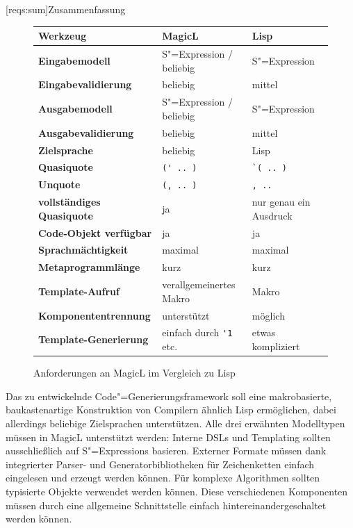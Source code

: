 \documentclass[12pt, a4paper, bibgerm]{scrbook}
\newcommand\icode[1]{\lstinline?#1?}
\newcommand\lsection{}
\newcommand{\sexp}{S"=Expression}
\newcommand{\sexps}{S"=Expressions}
\newcommand{\cgen}{Code"=Generierung}
\begin{document}
\lsection[reqs:sum]{Zusammenfassung}

\begin{figure}[h]
\begin{tabular}{|l|l|l|} \hline
\bf Werkzeug                 & \bf MagicL                    & \bf Lisp               \\\hline\hline    
\bf Eingabemodell            & \sexp{} / beliebig            & \sexp{}                \\\hline           
\bf Eingabevalidierung       & beliebig                      & mittel                 \\\hline      
\bf Ausgabemodell            & \sexp{} / beliebig            & \sexp{}                \\\hline      
\bf Ausgabevalidierung       & beliebig                      & mittel                 \\\hline      
\bf Zielsprache              & beliebig                      & Lisp                   \\\hline      
\bf Quasiquote               & \icode{(' .. )}               & \icode{`( .. )}        \\\hline   
\bf Unquote                  & \icode{(, .. )}               & \icode{, .. }          \\\hline
\bf vollständiges Quasiquote & ja                            & nur genau ein Ausdruck \\\hline      
\bf Code-Objekt verfügbar    & ja                            & ja                     \\\hline      
\bf Sprachmächtigkeit        & maximal                       & maximal                \\\hline      
\bf Metaprogrammlänge        & kurz                          & kurz                   \\\hline
\bf Template-Aufruf          & verallgemeinertes Makro       & Makro                  \\\hline      
\bf Komponententrennung      & unterstützt                   & möglich                \\\hline      
\bf Template-Generierung     & einfach durch \icode{'1} etc. & etwas kompliziert      \\\hline      
\end{tabular}
\caption{Anforderungen an MagicL im Vergleich zu Lisp}
\label{magicl:fig:reqs_sum}
\end{figure}

Das zu entwickelnde \cgen{}sframework soll eine makrobasierte,
baukastenartige Konstruktion von Compilern ähnlich Lisp ermöglichen,
dabei allerdings beliebige Zielsprachen unterstützen. Alle drei
erwähnten Modelltypen müssen in MagicL unterstützt werden: Interne DSLs
und Templating sollten ausschließlich auf \sexps{} basieren. Externer
Formate müssen dank integrierter Parser- und Generatorbibliotheken für
Zeichenketten einfach eingelesen und erzeugt werden können. Für komplexe
Algorithmen sollten typisierte Objekte verwendet werden können. Diese
verschiedenen Komponenten müssen durch eine allgemeine Schnittstelle
einfach hintereinandergeschaltet werden können.
\end{document}
